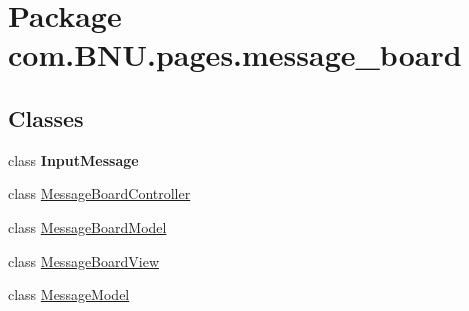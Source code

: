 \hypertarget{namespacecom_1_1_b_n_u_1_1pages_1_1message__board}{}\section{Package com.\+B\+N\+U.\+pages.\+message\+\_\+board}
\label{namespacecom_1_1_b_n_u_1_1pages_1_1message__board}
\subsection*{Classes}
\begin{DoxyCompactItemize}
\item 
class {\bfseries Input\+Message}
\item 
class \mbox{\hyperlink{classcom_1_1_b_n_u_1_1pages_1_1message__board_1_1_message_board_controller}{Message\+Board\+Controller}}
\item 
class \mbox{\hyperlink{classcom_1_1_b_n_u_1_1pages_1_1message__board_1_1_message_board_model}{Message\+Board\+Model}}
\item 
class \mbox{\hyperlink{classcom_1_1_b_n_u_1_1pages_1_1message__board_1_1_message_board_view}{Message\+Board\+View}}
\item 
class \mbox{\hyperlink{classcom_1_1_b_n_u_1_1pages_1_1message__board_1_1_message_model}{Message\+Model}}
\end{DoxyCompactItemize}
